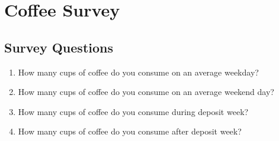 \chapter{Coffee Survey}

\section{Survey Questions}
\label{appA:coffee_survey}

\begin{enumerate}
    \item How many cups of coffee do you consume on an average weekday?
    \item How many cups of coffee do you consume on an average weekend day?
    \item How many cups of coffee do you consume during deposit week?
    \item How many cups of coffee do you consume after deposit week?
\end{enumerate}